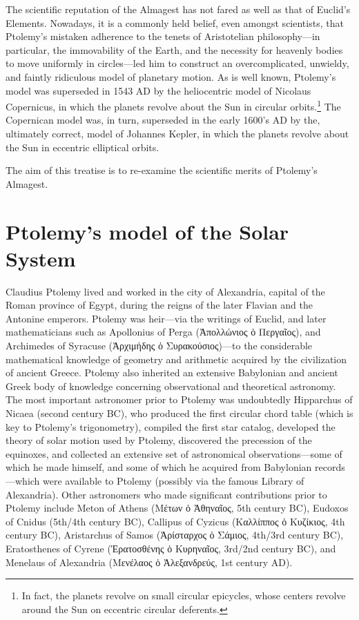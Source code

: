 The scientific reputation of the Almagest has not fared  as well
as that of
Euclid's Elements. Nowadays, it is a commonly held belief, even amongst scientists,  that Ptolemy's mistaken adherence to the
 tenets of Aristotelian philosophy---in particular, the immovability of the Earth, and
 the necessity for heavenly bodies to move uniformly in circles---led him to
 construct an overcomplicated,  unwieldy, and faintly ridiculous model of planetary motion. As is well known, Ptolemy's model was superseded  in 1543 AD by the heliocentric model of 
 Nicolaus Copernicus, in which the planets revolve about the
 Sun in circular orbits.\footnote{In fact, the planets revolve on small circular epicycles, whose centers revolve around
 the Sun on eccentric circular deferents.} The Copernican model was, in turn,
 superseded in the early 1600's AD by the, ultimately correct, model
 of Johannes Kepler, in which the planets revolve about the Sun in eccentric 
 elliptical orbits.
 
 The aim of this treatise is to re-examine the scientific merits
 of Ptolemy's Almagest. 

\section{Ptolemy's model of the Solar System}
 Claudius Ptolemy lived and worked in the city of Alexandria, capital of the Roman
 province of Egypt, during the reigns of the later Flavian and 
 the Antonine emperors. Ptolemy was heir---via the writings of Euclid, and later mathematicians
 such as Apollonius of Perga (Ἀπολλώνιος ὁ Περγαῖος), and Archimedes of Syracuse ({Ἀρχιμήδης ὁ Συρακούσιος})---to the considerable mathematical
 knowledge of geometry and arithmetic acquired by the civilization of ancient Greece. Ptolemy
  also inherited an extensive Babylonian and ancient Greek body of knowledge concerning observational and theoretical astronomy. The most important astronomer
 prior to Ptolemy was undoubtedly Hipparchus of Nicaea (second century BC), who produced the first circular chord table (which is key to Ptolemy's trigonometry), compiled the first star catalog, developed the theory of solar motion used by Ptolemy, discovered
 the precession of the equinoxes, and collected  an extensive set of astronomical
 observations---some of which he made himself, and
 some of which he acquired from Babylonian records---which were
 available to Ptolemy (possibly via the famous Library of Alexandria).
 Other astronomers who made significant contributions prior
 to Ptolemy include Meton of Athens (Μέτων ὁ Ἀθηναῖος, 5th century BC),  Eudoxos of Cnidus (5th/4th century BC), Callipus of Cyzicus (Καλλίππος ὁ Κυζίκιος, 4th century BC), Aristarchus of Samos (Ἀρίσταρχος ὁ Σάμιος, 4th/3rd century BC),  
 Eratosthenes of Cyrene (Ἐρατοσθένης ὁ Κυρηναῖος, 3rd/2nd century BC), and Menelaus
 of Alexandria (Μενέλαος ὁ Ἀλεξ\-ανδρεύς, 1st century AD).
 

